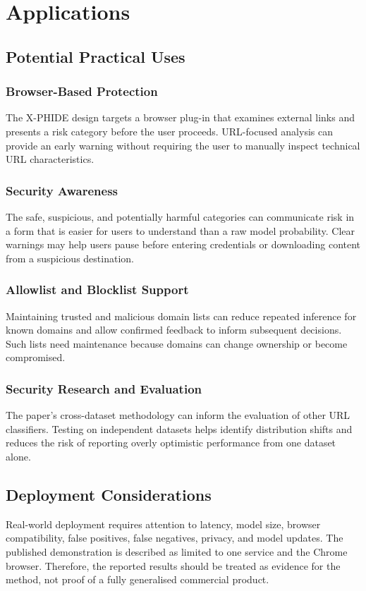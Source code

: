 \chapter{Applications}
\setcounter{equation}{0}
\section{Potential Practical Uses}
\subsection{Browser-Based Protection}
The X-PHIDE design targets a browser plug-in that examines external links and presents a risk category before the user proceeds. URL-focused analysis can provide an early warning without requiring the user to manually inspect technical URL characteristics.\cite{bib1}

\subsection{Security Awareness}
The safe, suspicious, and potentially harmful categories can communicate risk in a form that is easier for users to understand than a raw model probability. Clear warnings may help users pause before entering credentials or downloading content from a suspicious destination.

\subsection{Allowlist and Blocklist Support}
Maintaining trusted and malicious domain lists can reduce repeated inference for known domains and allow confirmed feedback to inform subsequent decisions. Such lists need maintenance because domains can change ownership or become compromised.

\subsection{Security Research and Evaluation}
The paper's cross-dataset methodology can inform the evaluation of other URL classifiers. Testing on independent datasets helps identify distribution shifts and reduces the risk of reporting overly optimistic performance from one dataset alone.

\section{Deployment Considerations}
Real-world deployment requires attention to latency, model size, browser compatibility, false positives, false negatives, privacy, and model updates. The published demonstration is described as limited to one service and the Chrome browser. Therefore, the reported results should be treated as evidence for the method, not proof of a fully generalised commercial product.
